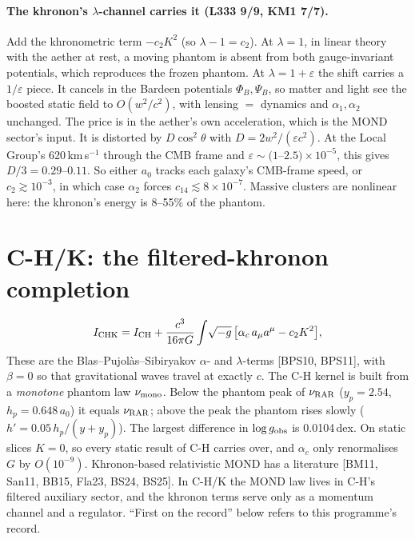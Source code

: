 \documentclass[10pt]{article}
\begin{document}
\paragraph{The khronon's $\lambda$-channel carries it (L333 9/9, KM1 7/7).}
Add the khronometric term $-c_2K^2$ (so $\lambda-1=c_2$). At $\lambda=1$, in linear theory with the aether at rest, a moving phantom is absent from both gauge-invariant potentials, which reproduces the frozen phantom.
At $\lambda=1+\varepsilon$ the shift carries a $1/\varepsilon$ piece. It cancels in the Bardeen potentials $\Phi_B,\Psi_B$, so matter and light see the boosted static field to $O(w^2/c^2)$, with lensing $=$ dynamics and $\alpha_1,\alpha_2$ unchanged.
The price is in the aether's own acceleration, which is the MOND sector's input. It is distorted by $D\cos^2\theta$ with $D=2w^2/(\varepsilon c^2)$. At the Local Group's 620\,km\,s$^{-1}$ through the CMB frame and $\varepsilon\sim(1$--$2.5)\times10^{-5}$, this gives $D/3=0.29$--$0.11$.
So either $a_0$ tracks each galaxy's CMB-frame speed, or $c_2\gtrsim10^{-3}$, in which case $\alpha_2$ forces $c_{14}\lesssim8\times10^{-7}$. Massive clusters are nonlinear here: the khronon's energy is 8--55\% of the phantom.

\section{C-H/K: the filtered-khronon completion}\label{sec:chk}

\begin{equation}
I_{\rm CHK}=I_{\rm CH}+\frac{c^3}{16\pi G}\int\!\sqrt{-g}\,\big[\alpha_c\,a_\mu a^\mu-c_2K^2\big],
\end{equation}
These are the Blas--Pujol\`as--Sibiryakov $\alpha$- and $\lambda$-terms [BPS10, BPS11], with $\beta=0$ so that gravitational waves travel at exactly $c$. The C-H kernel is built from a \emph{monotone} phantom law $\nu_{\rm mono}$. Below the phantom peak of $\nu_{\rm RAR}$ ($y_p=2.54$, $h_p=0.648\,a_0$) it equals $\nu_{\rm RAR}$; above the peak the phantom rises slowly ($h'=0.05\,h_p/(y+y_p)$). The largest difference in $\log g_{\rm obs}$ is 0.0104\,dex.
On static slices $K=0$, so every static result of C-H carries over, and $\alpha_c$ only renormalises $G$ by $O(10^{-9})$.
Khronon-based relativistic MOND has a literature [BM11, San11, BB15, Fla23, BS24, BS25]. In C-H/K the MOND law lives in C-H's filtered auxiliary sector, and the khronon terms serve only as a momentum channel and a regulator. ``First on the record'' below refers to this programme's record.
\end{document}
